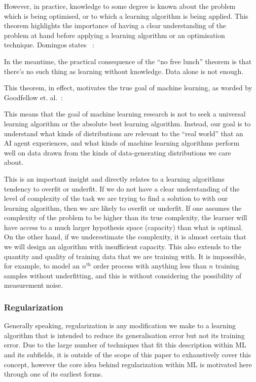 However, in practice, knowledge to some degree is known about the problem which
is being optimised, or to which a learning algorithm is being applied. This
theorem highlights the importance of having a clear understanding of the problem
at hand before applying a learning algorithm or an optimisation technique.
Domingos states ~\cite{Domingos15}:

\begin{fancyquotes}
    In the meantime, the practical consequence of the “no free lunch”
    theorem is that there’s no such thing as learning without knowledge. Data
    alone is not enough.
\end{fancyquotes}

This theorem, in effect, motivates the true goal of machine learning, as worded
by Goodfellow et. al.~\cite[p.~116]{Goodfellow-et-al-2016}:

\begin{fancyquotes}
    This means that the goal of machine learning research is not to seek
    a universal learning algorithm or the absolute best learning algorithm.
    Instead, our goal is to understand what kinds of distributions are relevant
    to the “real world” that an AI agent experiences, and what kinds of machine
    learning algorithms perform well on data drawn from the kinds of
    data-generating distributions we care about.
\end{fancyquotes}


This is an important insight and directly relates to a learning algorithms
tendency to overfit or underfit. If we do not have a clear understanding of the
level of complexity of the task we are trying to find a solution to with our
learning algorithm, then we are likely to overfit or underfit. If one assumes
the complexity of the problem to be higher than its true complexity, the learner
will have access to a much larger hypothesis space (capacity) than what is
optimal. On the other hand, if we underestimate the complexity, it is almost
certain that we will design an algorithm with insufficient capacity. This also
extends to the quantity and quality of training data that we are training with.
It is impossible, for example, to model an $n^\text{th}$ order process with anything less
than $n$ training samples without underfitting, and this is without considering
the possibility of measurement noise.

\subsubsection{Regularization}
Generally speaking, regularization is any modification we make to a learning
algorithm that is intended to reduce its generalisation error but not its
training error. Due to the large number of techniques that fit this description
within \gls{ML} and its subfields, it is outside of the scope of this paper to
exhaustively cover this concept, however the core idea behind regularization
within \gls{ML} is motivated here through one of its earliest forms.

